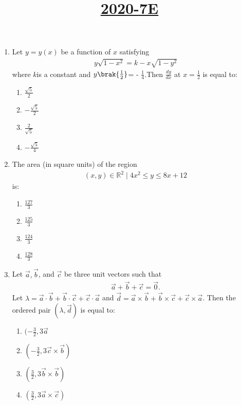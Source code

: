 \documentclass{article}
\title{\underline{\textbf{2020-7E }}}
\date{}
\begin{document}
\maketitle

\begin{enumerate}
	
\item Let $y = y(x)$ be a function of $x$ satisfying\begin{align*}y\sqrt{1 - x^2} = k - x\sqrt{1 - y^2}\end{align*} where $k$is a constant and $y\brak{\frac{1}{2}}$= - $\frac{1}{4}$.Then $\frac{dy}{dx}$ at $x = \frac{1}{2}$ is equal to:
    
\begin{enumerate}
   \item $\frac{\sqrt{5}}{2}$
   \item $- \frac{\sqrt{5}}{2}$
   \item $\frac{2}{\sqrt{5}}$
   \item $- \frac{\sqrt{5}}{4}$
\end{enumerate}
    
\item The area (in square units) of the region \begin{align*} {{(x,y)} \in \mathbb{R}^2 \mid 4x^2 \leq y \leq {8x + 12}}\end{align*} is:
    
\begin{enumerate}        
   \item $\frac{127}{3}$
   \item $\frac{125}{3}$
   \item $\frac{124}{3}$       
   \item $\frac{128}{3}$
\end{enumerate}

\item Let $\vec{a}, \vec{b}$, and $\vec{c}$ be three unit vectors such that \begin{align*}\vec{a} + \vec{b} + \vec{c} = \vec{0}.\end{align*}Let $\lambda = \vec{a} \cdot \vec{b} + \vec{b} \cdot \vec{c} + \vec{c} \cdot \vec{a}$ and $ \vec{d} = \vec{a} \times \vec{b} + \vec{b} \times \vec{c} + \vec{c} \times \vec{a}$. Then the ordered pair $(\lambda, \vec{d})$ is equal to:

\begin{enumerate}
   \item $(-\frac{3}{2}, 3 \vec{a}$
   \item $(-\frac{3}{2}, 3 \vec{c} \times \vec{b})$
   \item $(\frac{3}{2}, 3 \vec{b} \times \vec{b})$
   \item $(\frac{3}{2}, 3 \vec{a} \times \vec{c})$
\end{enumerate}
    

\end{enumerate}
\end{document}
